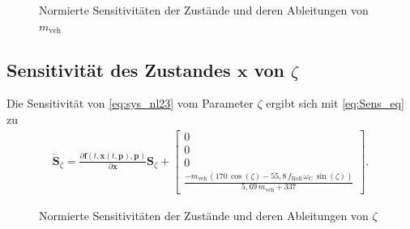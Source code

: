 \begin{figure}
\centering
\newlength\mheight 
\setlength\mheight{8cm}
\newlength\mwidth 
\setlength\mwidth{13cm}

\caption{Normierte Sensitivitäten der Zustände und deren Ableitungen von $m_\mathrm{veh}$}
\label{fig:Sens_m}
\end{figure}

\subsection{Sensitivität des Zustandes $\pmb{x}$ von $\zeta$}
Die Sensitivität von \eqref{eq:sys_nl23} vom Parameter $\zeta$ ergibt sich mit \eqref{eq:Sens_eq} zu
\begin{align}
\dot{\pmb{S}}_{\zeta} = \frac{\partial\pmb{f}(t,\pmb{x}(t,\pmb{p}),\pmb{p})}{\partial \pmb{x}} \pmb{S}_{\zeta}
+ \begin{bmatrix} 0 \\ 0 \\ 0 \\ \frac{-m_\mathrm{veh}\,(170\,\cos(\zeta) - 55,8\,f_\mathrm{Roll}\,\omega_\mathrm{C}\,\sin(\zeta))}{5,69\,m_\mathrm{veh} + 337}\end{bmatrix}.
\end{align}

\begin{figure}
\centering
\newlength\zheight 
\setlength\zheight{8cm}
\newlength\zwidth 
\setlength\zwidth{13cm}

\caption{Normierte Sensitivitäten der Zustände und deren Ableitungen von $\zeta$}
\label{fig:Sens_m}
\end{figure}


